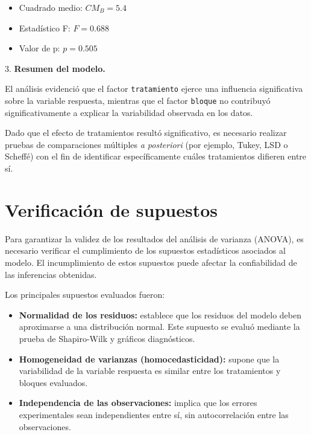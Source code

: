 \documentclass[
  spanish,
  letterpaper,
  DIV=11,
  numbers=noendperiod]{scrreprt}
\providecommand{\tightlist}{%
  \setlength{\itemsep}{0pt}\setlength{\parskip}{0pt}}
\begin{document}
\begin{itemize}
\tightlist
\item
  Cuadrado medio: \(CM_B = 5.4\)
\end{itemize}

\begin{itemize}
\tightlist
\item
  Estadístico F: \(F = 0.688\)
\end{itemize}

\begin{itemize}
\tightlist
\item
  Valor de p: \(p = 0.505\)
\end{itemize}

3. \textbf{Resumen del modelo.}

El análisis evidenció que el factor \texttt{tratamiento} ejerce una
influencia significativa sobre la variable respuesta, mientras que el
factor \texttt{bloque} no contribuyó significativamente a explicar la
variabilidad observada en los datos.

Dado que el efecto de tratamientos resultó significativo, es necesario
realizar pruebas de comparaciones múltiples \emph{a posteriori} (por
ejemplo, Tukey, LSD o Scheffé) con el fin de identificar específicamente
cuáles tratamientos difieren entre sí.

\section{Verificación de supuestos}\label{verificaciuxf3n-de-supuestos}

Para garantizar la validez de los resultados del análisis de varianza
(ANOVA), es necesario verificar el cumplimiento de los supuestos
estadísticos asociados al modelo. El incumplimiento de estos supuestos
puede afectar la confiabilidad de las inferencias obtenidas.

Los principales supuestos evaluados fueron:

\begin{itemize}
\item
  \textbf{Normalidad de los residuos:} establece que los residuos del
  modelo deben aproximarse a una distribución normal. Este supuesto se
  evaluó mediante la prueba de Shapiro-Wilk y gráficos diagnósticos.
\item
  \textbf{Homogeneidad de varianzas (homocedasticidad):} supone que la
  variabilidad de la variable respuesta es similar entre los
  tratamientos y bloques evaluados.
\item
  \textbf{Independencia de las observaciones:} implica que los errores
  experimentales sean independientes entre sí, sin autocorrelación entre
  las observaciones.
\end{itemize}
\end{document}
